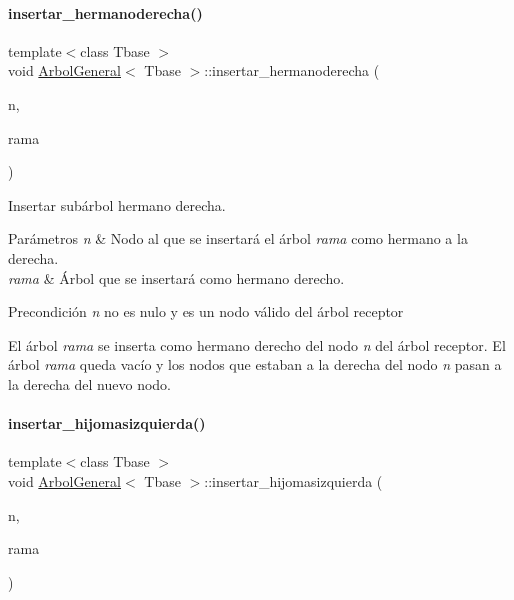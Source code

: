 \paragraph{\texorpdfstring{insertar\+\_\+hermanoderecha()}{insertar\_hermanoderecha()}}
{\footnotesize\ttfamily template$<$class Tbase $>$ \\
void \hyperlink{classArbolGeneral}{Arbol\+General}$<$ Tbase $>$\+::insertar\+\_\+hermanoderecha (\begin{DoxyParamCaption}\item[{\hyperlink{classArbolGeneral_a12cc1b74a9095d89bc7334290d332f7a}{Nodo}}]{n,  }\item[{\hyperlink{classArbolGeneral}{Arbol\+General}$<$ Tbase $>$ \&}]{rama }\end{DoxyParamCaption})}



Insertar subárbol hermano derecha. 


\begin{DoxyParams}{Parámetros}
{\em n} & Nodo al que se insertará el árbol {\itshape rama} como hermano a la derecha. \\
\hline
{\em rama} & Árbol que se insertará como hermano derecho. \\
\hline
\end{DoxyParams}
\begin{DoxyPrecond}{Precondición}
{\itshape n} no es nulo y es un nodo válido del árbol receptor
\end{DoxyPrecond}
El árbol {\itshape rama} se inserta como hermano derecho del nodo {\itshape n} del árbol receptor. El árbol {\itshape rama} queda vacío y los nodos que estaban a la derecha del nodo {\itshape n} pasan a la derecha del nuevo nodo. \hypertarget{classArbolGeneral_acf95226edb2a4e4c7fba82aaa82d0ec9}{}\label{classArbolGeneral_acf95226edb2a4e4c7fba82aaa82d0ec9} 
\paragraph{\texorpdfstring{insertar\+\_\+hijomasizquierda()}{insertar\_hijomasizquierda()}}
{\footnotesize\ttfamily template$<$class Tbase $>$ \\
void \hyperlink{classArbolGeneral}{Arbol\+General}$<$ Tbase $>$\+::insertar\+\_\+hijomasizquierda (\begin{DoxyParamCaption}\item[{\hyperlink{classArbolGeneral_a12cc1b74a9095d89bc7334290d332f7a}{Nodo}}]{n,  }\item[{\hyperlink{classArbolGeneral}{Arbol\+General}$<$ Tbase $>$ \&}]{rama }\end{DoxyParamCaption})}



